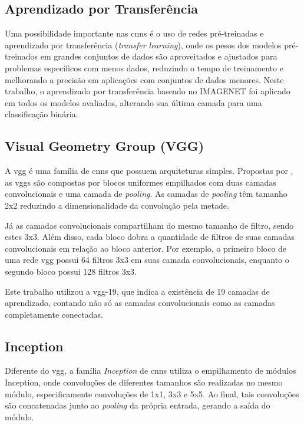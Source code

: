 \subsection{Aprendizado por Transferência}
Uma possibilidade importante nas \acrshort{cnn}s é o uso de redes pré-treinadas e aprendizado por transferência (\textit{transfer learning}), 
onde os pesos dos modelos pré-treinados em grandes conjuntos de dados são aproveitados e ajustados para problemas específicos com menos dados, 
reduzindo o tempo de treinamento e melhorando a precisão em aplicações com conjuntos de dados menores. 
Neste trabalho, o aprendizado por transferência baseado no IMAGENET \cite{deng2009imagenet} foi aplicado em todos os modelos avaliados, alterando sua última camada para uma classificação binária.
\subsection{Visual Geometry Group (VGG)}
A \acrshort{vgg} é uma família de \acrshort{cnn}s que possuem arquiteturas simples. 
Propostas por \cite{vgg}, as \acrshort{vgg}s são compostas por blocos uniformes empilhados com duas camadas convolucionais e uma camada de \textit{pooling}. 
As camadas de \textit{pooling} têm tamanho 2x2 reduzindo a dimensionalidade da convolução pela metade. 

Já as camadas convolucionais compartilham do mesmo tamanho de filtro, sendo estes 3x3. Além disso, cada bloco dobra a quantidade de filtros de suas camadas convolucionais em relação ao bloco anterior. Por exemplo, o primeiro bloco de uma rede \acrshort{vgg} possui 64 filtros 3x3 em suas camada convolucionais, enquanto o segundo bloco possui 128 filtros 3x3.

Este trabalho utilizou a \acrshort{vgg}-19, que indica a existência de 19 camadas de aprendizado, contando não só as camadas convolucionais como as camadas completamente conectadas.
\subsection{Inception}

Diferente do \acrshort{vgg}, a família \textit{Inception}\cite{inception} de \acrshort{cnn}s utiliza o empilhamento de módulos Inception, onde convoluções de diferentes tamanhos são realizadas no mesmo módulo, especificamente convoluções de 1x1, 3x3 e 5x5. Ao final, tais convoluções são concatenadas junto ao \textit{pooling} da própria entrada, gerando a saída do módulo. 

